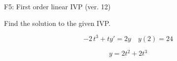 \begin{exercise}
  \begin{exerciseTitle}F5: First order linear IVP (ver. 12)\end{exerciseTitle}
  \begin{exerciseStatement}
    
Find the solution to the given IVP.

    
\[-2 \, t^{3} +ty'= 2 y \hspace{1em} y( 2 ) = 24\]

  \end{exerciseStatement}
  \begin{exerciseAnswer}
    
\[y= 2 t^ 2 +2 t^{3}\]

  \end{exerciseAnswer}
\end{exercise}